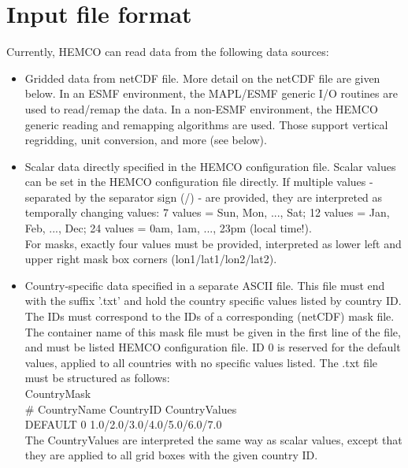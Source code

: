 \documentclass[12pt,a4paper]{article} %
\begin{document}
\section{Input file format} \label{Input_file_format}
Currently, HEMCO can read data from the following data sources:
\begin{itemize}
\item Gridded data from netCDF file. More detail on the netCDF file
   are given below. In an ESMF environment, the MAPL/ESMF generic I/O
   routines are used to read/remap the data. In a non-ESMF environment, 
   the HEMCO generic reading and remapping algorithms are used. Those 
   support vertical regridding, unit conversion, and more (see below).
 \item Scalar data directly specified in the HEMCO configuration file.
   Scalar values can be set in the HEMCO configuration file directly.
   If multiple values - separated by the separator sign (/) - are 
   provided, they are interpreted as temporally changing values:
   7 values = Sun, Mon, ..., Sat; 12 values = Jan, Feb, ..., Dec;
   24 values = 0am, 1am, ..., 23pm (local time!).\\
   For masks, exactly four values must be provided, interpreted as 
   lower left and upper right mask box corners (lon1/lat1/lon2/lat2).
\item Country-specific data specified in a separate ASCII file. This
   file must end with the suffix '.txt' and hold the country specific
   values listed by country ID. The IDs must correspond to the IDs of
   a corresponding (netCDF) mask file. The container name of this mask 
   file must be given in the first line of the file, and must be listed 
   HEMCO configuration file. ID 0 is reserved for the default values,
   applied to all countries with no specific values listed. The .txt 
   file must be structured as follows:\\
   CountryMask\\
   \# CountryName CountryID CountryValues\\
   DEFAULT 0 1.0/2.0/3.0/4.0/5.0/6.0/7.0\\
   The CountryValues are interpreted the same way as scalar values, 
   except that they are applied to all grid boxes with the given 
   country ID.
\end{itemize}
\end{document}
